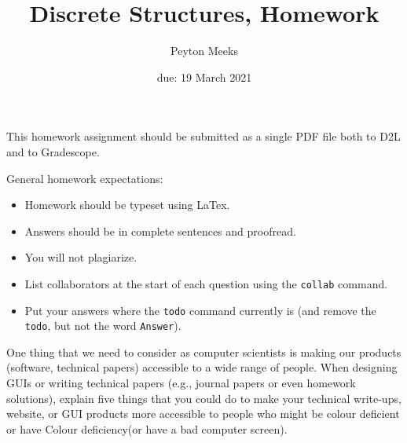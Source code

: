 \documentclass{article}
\title{Discrete Structures, Homework \hwnum}
\author{Peyton Meeks}
\date{due: 19 March 2021}
\begin{document}
\maketitle

This homework assignment should be
submitted as a single PDF file both to D2L and to Gradescope.

General homework expectations:
\begin{itemize}
    \item Homework should be typeset using LaTex.
    \item Answers should be in complete sentences and proofread.
    \item You will not plagiarize.
    \item List collaborators at the start of each question using the \texttt{collab} command.
    \item Put your answers where the \texttt{todo} command currently is (and
        remove the \texttt{todo}, but not the word \texttt{Answer}).
\end{itemize}


 

One thing that we need to consider as computer scientists is making our products
(software, technical papers) accessible to a wide range of people. When
designing GUIs or writing technical papers (e.g., journal papers or even
homework solutions), explain five things that you could do to make your
technical write-ups, website, or GUI products more accessible to people who
might be colour deficient or have Colour deficiency(or have a bad computer screen).
\end{document}

